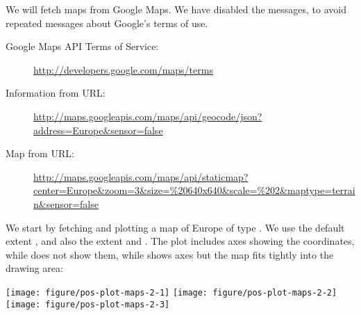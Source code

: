 \documentclass[paper=a4,10pt,div=17,headsepline,BCOR=12mm,twoside,open=right]{scrbook}\usepackage{knitr}
\begin{document}
\begin{framed}

We will fetch maps from Google Maps. We have disabled the messages, to avoid repeated messages about Google's terms of use.

\begin{description}
\item[Google Maps API Terms of Service:] \url{http://developers.google.com/maps/terms}
\item[Information from URL:] \url{http://maps.googleapis.com/maps/api/geocode/json?address=Europe&sensor=false}
\item[Map from URL:] \url{http://maps.googleapis.com/maps/api/staticmap?center=Europe&zoom=3&size=%20640x640&scale=%202&maptype=terrain&sensor=false}
\end{description}

\end{framed}

We start by fetching and plotting a map of Europe of type  . We use the default extent , and also the extent  and . The  plot includes axes showing the coordinates, while  does not show them, while  shows axes but the map fits tightly into the drawing area:



\begin{knitrout}\footnotesize
{}\color{fgcolor}\begin{kframe}
\begin{alltt}
 \hlkwb{<-} \hlstd{(}\hlstd{,} \hlstd{=}\hlstd{,} \hlstd{=}\hlstd{)}

  \hlstd{=} \hlstd{)}

  \hlstd{=} \hlstd{)}
\end{alltt}
\end{kframe}

{\centering \texttt{[image: figure/pos-plot-maps-2-1]} 
\texttt{[image: figure/pos-plot-maps-2-2]} 
\texttt{[image: figure/pos-plot-maps-2-3]} 

}



\end{knitrout}
\end{document}
